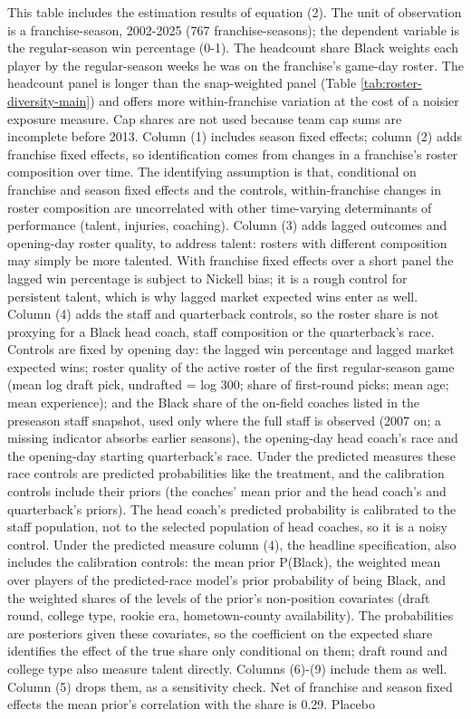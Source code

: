 \begin{table}[!h]
{\begin{threeparttable}
\begin{tablenotes}[para]
\item This table includes the estimation results of equation (2). The unit of observation is a franchise-season, 2002-2025 (767 franchise-seasons); the dependent variable is the regular-season win percentage (0-1). The headcount share Black weights each player by the regular-season weeks he was on the franchise's game-day roster. The headcount panel is longer than the snap-weighted panel (Table \ref{tab:roster-diversity-main}) and offers more within-franchise variation at the cost of a noisier exposure measure. Cap shares are not used because team cap sums are incomplete before 2013. Column (1) includes season fixed effects; column (2) adds franchise fixed effects, so identification comes from changes in a franchise's roster composition over time. The identifying assumption is that, conditional on franchise and season fixed effects and the controls, within-franchise changes in roster composition are uncorrelated with other time-varying determinants of performance (talent, injuries, coaching). Column (3) adds lagged outcomes and opening-day roster quality, to address talent: rosters with different composition may simply be more talented. With franchise fixed effects over a short panel the lagged win percentage is subject to Nickell bias; it is a rough control for persistent talent, which is why lagged market expected wins enter as well. Column (4) adds the staff and quarterback controls, so the roster share is not proxying for a Black head coach, staff composition or the quarterback's race. Controls are fixed by opening day: the lagged win percentage and lagged market expected wins; roster quality of the active roster of the first regular-season game (mean log draft pick, undrafted = log 300; share of first-round picks; mean age; mean experience); and the Black share of the on-field coaches listed in the preseason staff snapshot, used only where the full staff is observed (2007 on; a missing indicator absorbs earlier seasons), the opening-day head coach's race and the opening-day starting quarterback's race. Under the predicted measures these race controls are predicted probabilities like the treatment, and the calibration controls include their priors (the coaches' mean prior and the head coach's and quarterback's priors). The head coach's predicted probability is calibrated to the staff population, not to the selected population of head coaches, so it is a noisy control. Under the predicted measure column (4), the headline specification, also includes the calibration controls: the mean prior P(Black), the weighted mean over players of the predicted-race model's prior probability of being Black, and the weighted shares of the levels of the prior's non-position covariates (draft round, college type, rookie era, hometown-county availability). The probabilities are posteriors given these covariates, so the coefficient on the expected share identifies the effect of the true share only conditional on them; draft round and college type also measure talent directly. Columns (6)-(9) include them as well. Column (5) drops them, as a sensitivity check. Net of franchise and season fixed effects the mean prior's correlation with the  share is 0.29. Placebo 
\end{tablenotes}
\end{threeparttable}}
\end{table}
